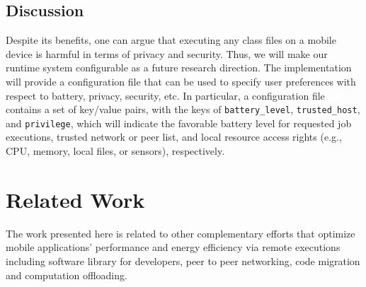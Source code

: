 \documentclass{sig-alternate}
\begin{document}
\subsection{Discussion}
Despite its benefits, one can argue that executing any class files on a mobile device is harmful in terms of privacy and security. Thus, we will make our runtime system configurable as a future research direction. The implementation will provide a configuration file that can be used to specify user preferences with respect to battery, privacy, security, etc. In particular, a configuration file contains a set of key/value pairs, with the keys of \texttt{battery\_level}, \texttt{trusted\_host}, and \texttt{privilege}, which will indicate the favorable battery level for requested job executions, trusted network or peer list, and local resource access rights (e.g., CPU, memory, local files, or sensors), respectively.



\section{Related Work}
\label{sec:related}
The work presented here is related to other complementary efforts that optimize mobile applications' performance and energy efficiency via remote executions including software library for developers, peer to peer networking, code migration and computation offloading.
\end{document}
